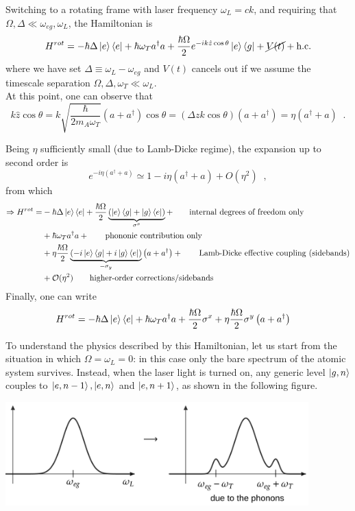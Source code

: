 Switching to a rotating frame with laser frequency $\omega_L = ck$, and requiring that $\Omega,\Delta \ll \omega_{eg}, \omega_L$, the Hamiltonian is
\begin{equation*}
H^{rot} = - \hbar \Delta
\ket{e}\bra{e} +
\hbar\omega_Ta^\dag a +
\frac{\hbar\Omega}{2}e^{-i k \hat{z}\cos\theta} \ket{e}\bra{g} +
\cancel{V(t)} + \text{h.c.}
\end{equation*}
where we have set $\Delta\equiv\omega_L-\omega_{eg}$ and $V(t)$ cancels out if we assume the timescale separation $\Omega, \Delta, \omega_T \ll \omega_L$. \\
At this point, one can observe that 
$$k\hat{z} \cos\theta = k \sqrt{\frac{\hbar}{2m_A\omega_T}}(a+a^\dag) \cos\theta =
(\Delta z k \cos\theta)(a+a^\dag) = \eta (a^\dag + a)  \;\;.$$

\noindent Being $\eta$ sufficiently small (due to Lamb-Dicke regime), the expansion up to second order is
$$e^{-i\eta(a^\dag+a)}\simeq 1- i\eta(a^\dag +a) + O(\eta^2) \;\;,$$ from which
\begin{align*}
\Rightarrow H^{rot} = &
-\hbar \Delta\ket{e}\bra{e}
+ \frac{\hbar\Omega}{2}
\underbrace{\left( \ket{e}\bra{g}+\ket{g}\bra{e} \right)}_{\sigma^x} +
\tag*{internal degrees of freedom only} \\
& + \hbar\omega_Ta^\dag a +
\tag*{phononic contribution only}\\
& + \eta\frac{\hbar\Omega}{2}
\underbrace{\left(-i\ket{e}\bra{g}+i\ket{g}\bra{e}\right)}
_{-\sigma_y}
\left( a + a^\dag \right) +
\tag*{Lamb-Dicke effective coupling (sidebands)}\\
&+ \mathcal{O}(\eta^2) \tag*{higher-order corrections/sidebands}
\end{align*}
Finally, one can write
\begin{align}
 H^{rot} &= -\hbar \Delta\ket{e}\bra{e} +
\hbar\omega_Ta^\dag a +
\frac{\hbar\Omega}{2}\sigma^x +
\eta\frac{\hbar\Omega}{2}\sigma^y
\left( a + a^\dag \right)
\end{align}

To understand the physics described by this Hamiltonian, let us start from the situation in which $\Omega = \omega_L =0 $: in this case only the bare spectrum of the atomic system survives. Instead, when the laser light is turned on, any generic level $\ket{g,n}$ couples to $\ket{e, n-1}, \ket{e,n}$ and $\ket{e, n+1}$, as shown in the following figure. 

\begin{center}

\includegraphics[height=4cm]{img/dicke-red-plot.png}
\end{center}

